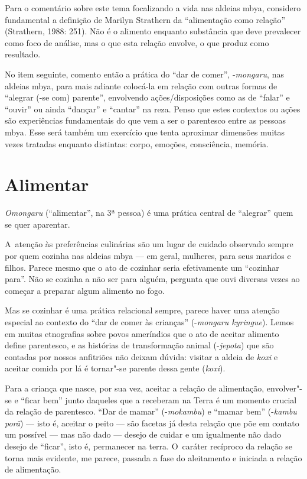 Para o comentário sobre este tema focalizando a vida nas aldeias mbya,
considero fundamental a definição de Marilyn Strathern da ``alimentação
como relação'' (Strathern, 1988: 251). Não é o alimento enquanto
substância que deve prevalecer como foco de análise, mas o que esta
relação envolve, o que produz como resultado.

No item seguinte, comento então a prática do ``dar de comer'', -\emph{mongaru},
nas aldeias mbya, para mais adiante colocá-la em relação com outras
formas de ``alegrar (-se com) parente'', envolvendo ações/disposições
como as de ``falar'' e ``ouvir'' ou ainda ``dançar'' e ``cantar'' na reza. Penso que
estes contextos ou ações são experiências fundamentais do que vem a ser
o parentesco entre as pessoas mbya. Esse será também um exercício que
tenta aproximar dimensões muitas vezes tratadas enquanto distintas:
corpo, emoções, consciência, memória.

\section{Alimentar}

\emph{Omongaru} (``alimentar'', na 3ª pessoa) é uma prática central de ``alegrar''
quem se quer aparentar.

A~atenção às preferências culinárias são um lugar de cuidado observado
sempre por quem cozinha nas aldeias mbya --- em geral, mulheres, para
seus maridos e filhos. Parece mesmo que o ato de cozinhar seria
efetivamente um ``cozinhar para''. Não se cozinha a não ser para alguém,
pergunta que ouvi diversas vezes ao começar a preparar algum alimento
no fogo. 

Mas se cozinhar é uma prática relacional sempre, parece haver uma
atenção especial ao contexto do ``dar de comer às crianças'' (-\emph{mongaru
kyringue}). Lemos em muitas etnografias sobre povos ameríndios que o ato
de aceitar alimento define parentesco, e as histórias de transformação
animal (-\emph{jepota}) que são contadas por nossos anfitriões não deixam
dúvida: visitar a aldeia de \emph{koxi} e aceitar comida por lá é tornar"-se
parente dessa gente (\emph{koxi}).

Para a criança que nasce, por sua vez, aceitar a relação de alimentação,
envolver"-se e ``ficar bem'' junto daqueles que a receberam na Terra é um
momento crucial da relação de parentesco. ``Dar de mamar'' (-\emph{mokambu}) e
``mamar bem'' (-\emph{kambu porã}) --- isto é, aceitar o peito --- são facetas já
desta relação que põe em contato um possível --- mas não dado --- desejo de
cuidar e um igualmente não dado desejo de ``ficar'', isto é, permanecer na
terra. O~caráter recíproco da relação se torna mais evidente, me
parece, passada a fase do aleitamento e iniciada a relação de
alimentação.

